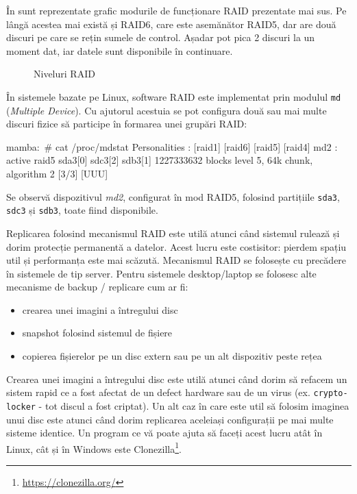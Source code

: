 În  sunt reprezentate grafic modurile de
funcționare RAID prezentate mai sus. Pe lângă acestea mai există și RAID6, care
este asemănător RAID5, dar are două discuri pe care se rețin sumele de control. Așadar
pot pica 2 discuri la un moment dat, iar datele sunt disponibile în continuare.

\begin{figure}[htbp]
	\centering
	\def\svgwidth{\columnwidth}
	
	\caption{Niveluri RAID}
        \label{fig:storage:raid}
\end{figure}

În sistemele bazate pe Linux, software RAID este implementat prin modulul \texttt{md}
(\textit{Multiple Device}). Cu ajutorul acestuia se pot configura două sau mai multe
discuri fizice să participe în formarea unei grupări RAID:

\begin{screen}
mamba:~# cat /proc/mdstat
Personalities : [raid1] [raid6] [raid5] [raid4]
md2 : active raid5 sda3[0] sdc3[2] sdb3[1]
      1227333632 blocks level 5, 64k chunk, algorithm 2 [3/3] [UUU]
\end{screen}

Se observă dispozitivul \textit{md2}, configurat în mod RAID5, folosind
partițiile \texttt{sda3}, \texttt{sdc3} și \texttt{sdb3}, toate fiind disponibile.

Replicarea folosind mecanismul RAID este utilă atunci când sistemul rulează și
dorim protecție permanentă a datelor. Acest lucru este costisitor: pierdem
spațiu util și performanța este mai scăzută. Mecanismul RAID se folosește cu
precădere în sistemele de tip server. Pentru sistemele desktop/laptop se
folosesc alte mecanisme de backup / replicare cum ar fi:

\begin{itemize}
	\item crearea unei imagini a întregului disc
	\item snapshot folosind sistemul de fișiere
	\item copierea fișierelor pe un disc extern sau pe un alt dispozitiv
		peste rețea
\end{itemize}

Crearea unei imagini a întregului disc este utilă atunci când dorim să refacem
un sistem rapid ce a fost afectat de un defect hardware sau de un virus (ex.
\texttt{crypto-locker} - tot discul a fost criptat). Un alt caz în care este util să
folosim imaginea unui disc este atunci când dorim replicarea aceleiași
configurații pe mai multe sisteme identice. Un program ce vă poate ajuta să
faceți acest lucru atât în Linux, cât și în Windows este Clonezilla\footnote{\url{https://clonezilla.org/}}.

